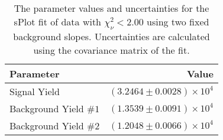 
\begin{table}[ht]
    \begin{center}
        \begin{tabular}{lr}\toprule
            Parameter & Value \\\midrule
            Signal Yield & $(3.2464 \pm 0.0028) \times 10^{4}$ \\
            Background Yield $\#1$ & $(1.3539 \pm 0.0091) \times 10^{4}$ \\
            Background Yield $\#2$ & $(1.2048 \pm 0.0066) \times 10^{4}$ \\\bottomrule
        \end{tabular}
        \caption{The parameter values and uncertainties for the sPlot fit of data with $\chi^2_\nu < 2.00$ using two fixed background slopes. Uncertainties are calculated using the covariance matrix of the fit.}\label{tab:splot-fit-results-chisqdof-2.00-fixed-2}
    \end{center}
\end{table}
